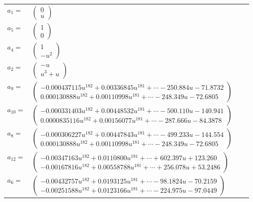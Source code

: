 \documentclass[1p]{elsarticle_modified}
\theoremstyle{definition}
\begin{document}
\begin{tabular}{m{7pt} m{180pt} m{7pt} m{180pt} }
\flushright $a_{1}=$&$\begin{pmatrix}0\\u\end{pmatrix}$ \\
\flushright $a_{5}=$&$\begin{pmatrix}1\\0\end{pmatrix}$ \\
\flushright $a_{4}=$&$\begin{pmatrix}1\\- u^2\end{pmatrix}$ \\
\flushright $a_{2}=$&$\begin{pmatrix}- u\\u^3+u\end{pmatrix}$ \\
\flushright $a_{9}=$&$\begin{pmatrix}-0.000437115 u^{182}+0.00336845 u^{181}+\cdots-250.884 u-71.8732\\0.000130888 u^{182}+0.00110998 u^{181}+\cdots-248.349 u-72.6805\end{pmatrix}$ \\
\flushright $a_{10}=$&$\begin{pmatrix}-0.000331403 u^{182}+0.00448532 u^{181}+\cdots-500.110 u-140.941\\0.0000835116 u^{182}+0.00156077 u^{181}+\cdots-287.666 u-84.3878\end{pmatrix}$ \\
\flushright $a_{8}=$&$\begin{pmatrix}-0.000306227 u^{182}+0.00447843 u^{181}+\cdots-499.233 u-144.554\\0.000130888 u^{182}+0.00110998 u^{181}+\cdots-248.349 u-72.6805\end{pmatrix}$ \\
\flushright $a_{12}=$&$\begin{pmatrix}-0.00347163 u^{182}+0.0110800 u^{181}+\cdots+602.397 u+123.260\\-0.00167816 u^{182}+0.00558788 u^{181}+\cdots+256.078 u+53.2486\end{pmatrix}$ \\
\flushright $a_{6}=$&$\begin{pmatrix}-0.00432757 u^{182}+0.0193125 u^{181}+\cdots-98.1824 u-70.2159\\-0.00251588 u^{182}+0.0123166 u^{181}+\cdots-224.975 u-97.0449\end{pmatrix}$ \\

\end{tabular}
\end{document}
